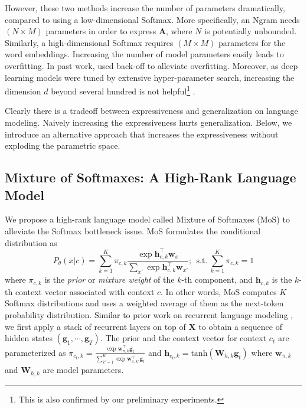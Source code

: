 However, these two methods increase the number of parameters dramatically, compared to using a low-dimensional Softmax. More specifically, an Ngram needs $(N \times M)$ parameters in order to express $\mathbf{A}$, where $N$ is potentially unbounded. Similarly, a high-dimensional Softmax requires $(M \times M)$ parameters for the word embeddings. Increasing the number of model parameters easily leads to overfitting. In past work, \cite{kneser1995improved} used back-off to alleviate overfitting. Moreover, as deep learning models were tuned by extensive hyper-parameter search, increasing the dimension $d$ beyond several hundred is not helpful\footnote{This is also confirmed by our preliminary experiments.} \citep{merity2017regularizing,melis2017state,krause2017dynamic}.

Clearly there is a tradeoff between expressiveness and generalization on language modeling. Naively increasing the expressiveness hurts generalization. Below, we introduce an alternative approach that increases the expressiveness without exploding the parametric space. %

\subsection{Mixture of Softmaxes: A High-Rank Language Model}

We propose a high-rank language model called Mixture of Softmaxes (MoS) to alleviate the Softmax bottleneck issue. MoS formulates the conditional distribution as
\[
P_\theta(x | c) = \sum_{k = 1}^K \pi_{c,k} \frac{\exp \mathbf{h}_{c,k}^\top \mathbf{w}_x}{\sum_{x'} \exp \mathbf{h}_{c,k}^\top \mathbf{w}_{x'}}; ~~\text{s.t.}~\sum_{k = 1}^K \pi_{c,k} = 1
\]
where $\pi_{c,k}$ is the {\em prior} or {\em mixture weight} of the $k$-th component, and $\mathbf{h}_{c,k}$ is the $k$-th context vector associated with context $c$. In other words, MoS computes $K$ Softmax distributions and uses a weighted average of them as the next-token probability distribution. Similar to prior work on recurrent language modeling \citep{merity2017regularizing,melis2017state,krause2017dynamic}, we first apply a stack of recurrent layers on top of $\mathbf{X}$ to obtain a sequence of hidden states $(\mathbf{g}_1, \cdots, \mathbf{g}_T)$. The prior and the context vector for context $c_t$ are parameterized as
$\pi_{c_t,k} = \frac{\exp \mathbf{w}_{\pi,k}^\top \mathbf{g}_t}{\sum_{k'=1}^K \exp \mathbf{w}_{\pi,k'}^\top \mathbf{g}_t}$ and $\mathbf{h}_{c_t,k} = \text{tanh}(\mathbf{W}_{h,k} \mathbf{g}_t)$
where $\mathbf{w}_{\pi,k}$ and $\mathbf{W}_{h,k}$ are model parameters.

